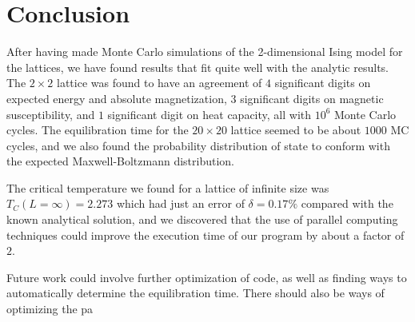 \documentclass[../main.tex]{subfiles}
\begin{document}
\section{Conclusion}\label{sec:conclusion}

After having made Monte Carlo simulations of the 2-dimensional Ising model for the lattices, we have found results that fit quite well with the analytic results. The $2 \times 2$ lattice was found to have an agreement of $4$ significant digits on expected energy and absolute magnetization, $3$ significant digits on magnetic susceptibility, and $1$ significant digit on heat capacity, all with $10^6$ Monte Carlo cycles. The equilibration time for the $20 \times 20$ lattice seemed to be about $1000$ MC cycles, and we also found the probability distribution of state to conform with the expected Maxwell-Boltzmann distribution. 

The critical temperature we found for a lattice of infinite size was $T_C(L = \infty) = 2.273$ which had just an error of $\delta = 0.17\%$ compared with the known analytical solution, and we discovered that the use of parallel computing techniques could improve the execution time of our program by about a factor of $2$.

Future work could involve further optimization of code, as well as finding ways to automatically determine the equilibration time. There should also be ways of optimizing the pa
\end{document}
